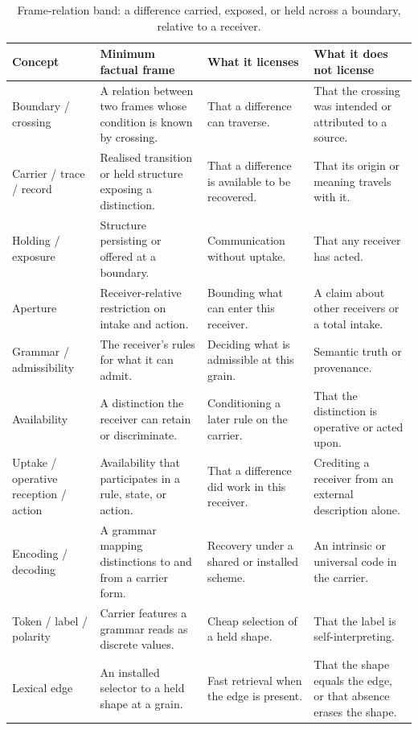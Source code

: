 \documentclass[11pt,a4paper]{article}
\theoremstyle{remark}\newtheorem{remark}[definition]{Remark}
\begin{document}
\begingroup\small
\begin{table}[t]\centering\small
\caption{Frame-relation band: a difference carried, exposed, or held across a boundary, relative to a receiver.}
\label{tab:band-frame}
\begin{tabular}{@{}>{\raggedright\arraybackslash}p{}>{\raggedright\arraybackslash}p{}>{\raggedright\arraybackslash}p{}>{\raggedright\arraybackslash}p{}@{}}
\toprule
\textbf{Concept} & \textbf{Minimum factual frame} & \textbf{What it licenses} & \textbf{What it does not license}\\
\midrule
Boundary / crossing & A relation between two frames whose condition is known by crossing. & That a difference can traverse. & That the crossing was intended or attributed to a source.\\
Carrier / trace / record & Realised transition or held structure exposing a distinction. & That a difference is available to be recovered. & That its origin or meaning travels with it.\\
Holding / exposure & Structure persisting or offered at a boundary. & Communication without uptake. & That any receiver has acted.\\
Aperture & Receiver-relative restriction on intake and action. & Bounding what can enter this receiver. & A claim about other receivers or a total intake.\\
Grammar / admissibility & The receiver's rules for what it can admit. & Deciding what is admissible at this grain. & Semantic truth or provenance.\\
Availability & A distinction the receiver can retain or discriminate. & Conditioning a later rule on the carrier. & That the distinction is operative or acted upon.\\
Uptake / operative reception / action & Availability that participates in a rule, state, or action. & That a difference did work in this receiver. & Crediting a receiver from an external description alone.\\
Encoding / decoding & A grammar mapping distinctions to and from a carrier form. & Recovery under a shared or installed scheme. & An intrinsic or universal code in the carrier.\\
Token / label / polarity & Carrier features a grammar reads as discrete values. & Cheap selection of a held shape. & That the label is self-interpreting.\\
Lexical edge & An installed selector to a held shape at a grain. & Fast retrieval when the edge is present. & That the shape equals the edge, or that absence erases the shape.\\

\end{tabular}
\end{table}
\end{document}
